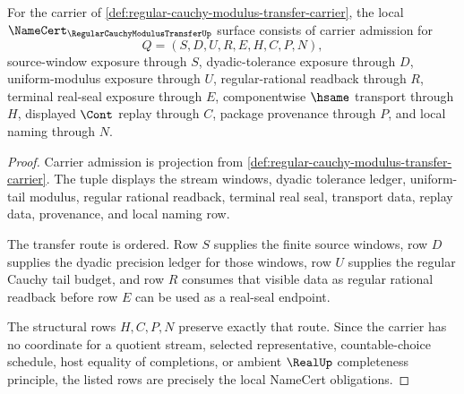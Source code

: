 \begin{theorem}
\label{thm:regular-cauchy-modulus-transfer-namecert-obligations}
For the carrier of \autoref{def:regular-cauchy-modulus-transfer-carrier}, the local $\NameCert_{\RegularCauchyModulusTransferUp}$ surface consists of carrier admission for
$$
Q=(S,D,U,R,E,H,C,P,N),
$$
source-window exposure through $S$, dyadic-tolerance exposure through $D$, uniform-modulus exposure through $U$, regular-rational readback through $R$, terminal real-seal exposure through $E$, componentwise $\hsame$ transport through $H$, displayed $\Cont$ replay through $C$, package provenance through $P$, and local naming through $N$.
\end{theorem}
\begin{proof}
Carrier admission is projection from \autoref{def:regular-cauchy-modulus-transfer-carrier}. The tuple displays the stream windows, dyadic tolerance ledger, uniform-tail modulus, regular rational readback, terminal real seal, transport data, replay data, provenance, and local naming row.

The transfer route is ordered. Row $S$ supplies the finite source windows, row $D$ supplies the dyadic precision ledger for those windows, row $U$ supplies the regular Cauchy tail budget, and row $R$ consumes that visible data as regular rational readback before row $E$ can be used as a real-seal endpoint.

The structural rows $H,C,P,N$ preserve exactly that route. Since the carrier has no coordinate for a quotient stream, selected representative, countable-choice schedule, host equality of completions, or ambient $\RealUp$ completeness principle, the listed rows are precisely the local NameCert obligations.
\end{proof}

